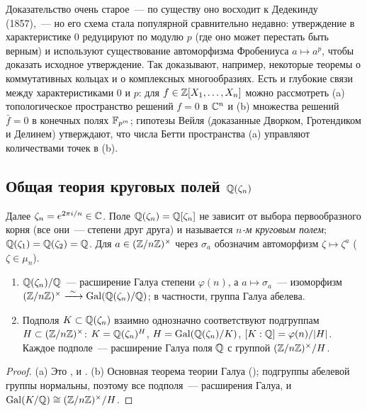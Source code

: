 \begin{aside}[5.11]
Доказательство  очень старое~--- по существу оно восходит к Дедекинду (1857),~--- но его схема стала популярной
сравнительно недавно: утверждение в характеристике $0$ редуцируют по модулю $p$ (где оно может перестать быть верным) и
используют существование автоморфизма Фробениуса $a\mapsto a^p$, чтобы доказать исходное утверждение. Так доказывают,
например, некоторые теоремы о коммутативных кольцах и о комплексных многообразиях. Есть и глубокие связи между
характеристиками $0$ и $p$: для $f\in\mathbb Z[X_1,\dots,X_n]$ можно рассмотреть (a) топологическое пространство решений $f=0$ в
$\mathbb C^n$ и (b) множества решений $\bar f=0$ в конечных полях $\mathbb F_{p^m}$; гипотезы Вейля (доказанные Дворком, Гротендиком
и Делинем) утверждают, что
числа Бетти пространства (a) управляют количествами точек в (b).
\end{aside}

\subsection*{Общая теория круговых полей $\mathbb Q(\zeta_n)$}

Далее $\zeta_n=e^{2\pi i/n}\in\mathbb C$. Поле $\mathbb Q(\zeta_n)=\mathbb Q[\zeta_n]$ не зависит от выбора первообразного корня (все они~---
степени друг друга) и называется \emph{$n$-м круговым полем}; $\mathbb Q(\zeta_1)=\mathbb Q(\zeta_2)=\mathbb Q$. Для $a\in(\mathbb Z/n\mathbb Z)^\times$ через
$\sigma_a$ обозначим автоморфизм $\zeta\mapsto\zeta^a$ ($\zeta\in\mu_n$).

\begin{theorem}[5.11a]
\begin{enumerate}[label=\textup{(\alph*)}]
\item $\mathbb Q(\zeta_n)/\mathbb Q$~--- расширение Галуа степени $\varphi(n)$, а $a\mapsto\sigma_a$~--- изоморфизм
$(\Z/n\Z)^\times\xrightarrow{\ \sim\ }\Gal(\Q(\zeta_n)/\Q)$; в частности, группа Галуа абелева.
\item Подполя $K\subset\mathbb Q(\zeta_n)$ взаимно однозначно соответствуют подгруппам $H\subset(\mathbb Z/n\mathbb Z)^\times$:
$K=\mathbb Q(\zeta_n)^H$, $H=\operatorname{Gal}(\mathbb Q(\zeta_n)/K)$, $[K:\mathbb Q]=\varphi(n)/|H|$. Каждое подполе~--- расширение Галуа поля $\mathbb Q$ с группой
$(\mathbb Z/n\mathbb Z)^\times/H$.
\end{enumerate}
\end{theorem}

\begin{proof}
(a) Это ,  и . (b) Основная теорема теории Галуа (); подгруппы абелевой группы нормальны, поэтому все
подполя~--- расширения Галуа, и $\operatorname{Gal}(K/\mathbb Q)\cong(\mathbb Z/n\mathbb Z)^\times/H$.
\end{proof}

